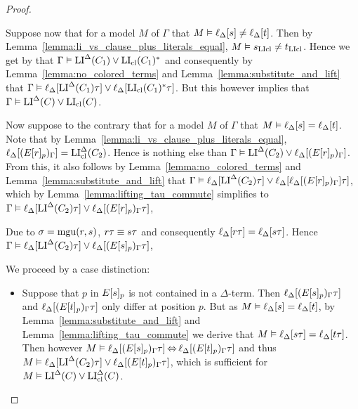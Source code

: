 \documentclass[,%
	draft=false,%
	numbers=noendperiod
	11pt,
	a4paper,
	oneside,%
	openany,
]{memoir}
\begin{document}
\begin{proof}
\begin{description}

			Suppose now that for a model $M$ of $\Gamma$ that $M \vDash \ell_{\Delta}[s] \neq \ell_{\Delta}[t]$.
			Then by Lemma~\ref{lemma:li_vs_clause_plus_literals_equal}, 
			$M \vDash s_{\operatorname{LIcl}} \neq t_{\operatorname{LIcl}}$.
			Hence we get by \markA{} that 
			$\Gamma \vDash \operatorname{LI}^\Delta(C_1) \lor \operatorname{LI}_{\operatorname{cl}}(C_1)^*$
			and consequently 
			by Lemma~\ref{lemma:no_colored_terms} and Lemma~\ref{lemma:substitute_and_lift} that 
			$\Gamma \vDash \ell_{\Delta}[\operatorname{LI}^\Delta(C_1)\tau] \lor \ell_{\Delta}[\operatorname{LI}_{\operatorname{cl}}(C_1)^*\tau]$.
			But this however implies that $\Gamma \vDash \operatorname{LI}^\Delta(C) \lor \operatorname{LI}_{\operatorname{cl}}(C)$.

			Now suppose to the contrary that for a model $M$ of $\Gamma$ that $M \entails \lifdeltanovar{s} =\nolinebreak \lifdeltanovar{t}$.
			Note that by Lemma~\ref{lemma:li_vs_clause_plus_literals_equal}, $\ell_{\Delta}[ (E{[r]_{p}})_\Gamma] = \operatorname{LI}_{\operatorname{cl}}^\Delta(C_2)$.
			Hence \markB{} is nothing else than
			$\Gamma \vDash \operatorname{LI}^\Delta(C_2) \lor \ell_{\Delta}[ (E{[r]_{p}})_\Gamma ]$.
			From this, it also follows by Lemma~\ref{lemma:no_colored_terms} and Lemma~\ref{lemma:substitute_and_lift} that
			$\Gamma \vDash \ell_{\Delta}[\operatorname{LI}^\Delta(C_2)\tau] \lor \ell_{\Delta}[\ell_{\Delta}[ (E{[r]_{p}})_\Gamma ]\tau]$, 
			which by Lemma~\ref{lemma:lifting_tau_commute} simplifies to
			$\Gamma \vDash \ell_{\Delta}[\operatorname{LI}^\Delta(C_2)\tau] \lor \ell_{\Delta}[(E{[r]_{p}})_\Gamma \tau]$, 



			Due to $\sigma = \operatorname{mgu}(r, s)$, $r\tau\equiv s\tau$ and consequently $\ell_{\Delta}[r\tau] = \ell_{\Delta}[s\tau]$.
			Hence 
			$\Gamma \vDash \ell_{\Delta}[\operatorname{LI}^\Delta(C_2)\tau] \lor \ell_{\Delta}[(E{[s]_{p}})_\Gamma \tau]$, 

			
			We proceed by a case distinction:
			\begin{itemize}
				\item
					Suppose that $p$ in $E{[s]_{p}}$ is not contained in a $\Delta$-term.
					Then $\ell_{\Delta}[ (E{[s]_{p}})_\Gamma \tau ]$ and $\ell_{\Delta}[ (E{[t]_{p}})_\Gamma \tau]$ only differ at position $p$.
					But as $M\vDash \ell_{\Delta}[s] = \ell_{\Delta}[t]$, 
					by Lemma~\ref{lemma:substitute_and_lift} and
					Lemma~\ref{lemma:lifting_tau_commute} we derive that
					$M\vDash \ell_{\Delta}[s\tau] = \ell_{\Delta}[t\tau]$. 
					Then however 
					$M\vDash \ell_{\Delta}[ (E{[s]_{p}})_\Gamma \tau ] \operatorname{\Leftrightarrow} \ell_{\Delta}[ (E{[t]_{p}})_\Gamma \tau]$
					and thus
					$M \vDash \ell_{\Delta}[\operatorname{LI}^\Delta(C_2)\tau] \lor \ell_{\Delta}[ (E{[t]_{p}})_\Gamma \tau ]$,
					which is sufficient for
					$M \vDash \operatorname{LI}^\Delta(C) \lor \operatorname{LI}_{\operatorname{cl}}^\Delta(C)$.


\end{itemize}
\end{description}
\end{proof}
\end{document}
